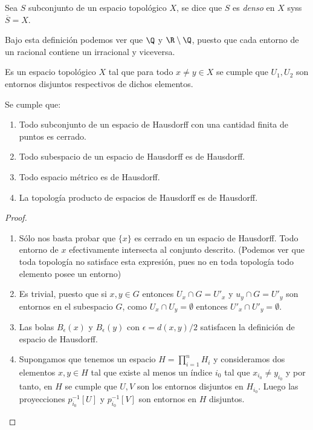 \documentclass[11pt,oneside,a4paper]{book}
\begin{document}
\begin{mydef}[Densidad]
Sea $S$ subconjunto de un espacio topológico $X$, se dice que $S$ es \textit{denso} en $X$ syss $\overline{S}=X$.
\end{mydef}
Bajo esta definición podemos ver que $\Q$ y $\R\setminus\Q$, puesto que cada entorno de un racional contiene un irracional y viceversa.
\begin{mydef}
Es un espacio topológico $X$ tal que para todo $x\neq y\in X$ se cumple que $U_1,U_2$ son entornos disjuntos respectivos de dichos elementos.
\end{mydef}
\begin{thm}
Se cumple que:
\begin{enumerate}[$a$)]
\item Todo subconjunto de un espacio de Hausdorff con una cantidad finita de puntos es cerrado.
\item Todo subespacio de un espacio de Hausdorff es de Hausdorff.
\item Todo espacio métrico es de Hausdorff.
\item La topología producto de espacios de Hausdorff es de Hausdorff.
\end{enumerate}
\end{thm}
\begin{proof}
\begin{enumerate}[$a$)]
\item Sólo nos basta probar que $\{x\}$ es cerrado en un espacio de Hausdorff. Todo entorno de $x$ efectivamente intersecta al conjunto descrito. (Podemos ver que toda topología no satisface esta expresión, pues no en toda topología todo elemento posee un entorno)
\item Es trivial, puesto que si $x,y\in G$ entonces $U_x\cap G=U'_x$ y $u_y\cap G=U'_y$ son entornos en el subespacio $G$, como $U_x\cap U_y=\emptyset$ entonces $U'_x\cap U'_y=\emptyset$.
\item Las bolas $B_\epsilon(x)$ y $B_\epsilon(y)$ con $\epsilon=d(x,y)/2$ satisfacen la definición de espacio de Hausdorff.
\item Supongamos que tenemos un espacio $H=\prod_{i=1}^n H_i$ y consideramos dos elementos $x,y\in H$ tal que existe al menos un índice $i_0$ tal que $x_{i_0}\neq y_{i_0}$ y por tanto, en $H$ se cumple que $U,V$ son los entornos disjuntos en $H_{i_0}$. Luego las proyecciones $p_{i_0}^{-1}[U]$ y $p_{i_0}^{-1}[V]$ son entornos en $H$ disjuntos.
\end{enumerate}
\end{proof}
\end{document}
